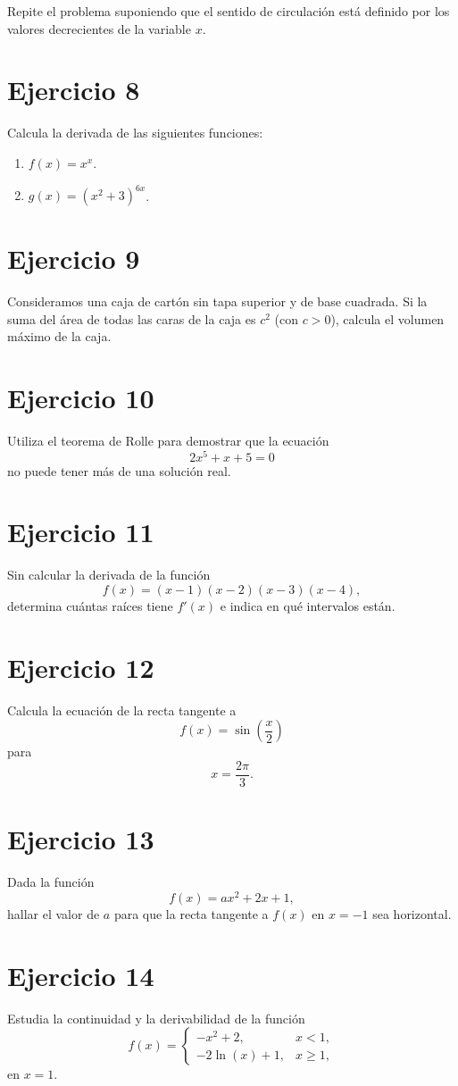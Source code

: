 \documentclass[12pt]{article}
\begin{document}
Repite el problema suponiendo que el sentido de circulación está definido por los valores decrecientes de la variable \(x\).

\section*{Ejercicio 8}
Calcula la derivada de las siguientes funciones:
\begin{enumerate}[label=\alph*)]
    \item \(f(x)=x^x\).
    \item \(g(x)=(x^2+3)^{6x}\).
\end{enumerate}

\section*{Ejercicio 9}
Consideramos una caja de cartón sin tapa superior y de base cuadrada. Si la suma del área de todas las caras de la caja es \(c^2\) (con \(c>0\)), calcula el volumen máximo de la caja.

\section*{Ejercicio 10}
Utiliza el teorema de Rolle para demostrar que la ecuación
\[
2x^5+x+5=0
\]
no puede tener más de una solución real.

\section*{Ejercicio 11}
Sin calcular la derivada de la función
\[
f(x)=(x-1)(x-2)(x-3)(x-4),
\]
determina cuántas raíces tiene \(f'(x)\) e indica en qué intervalos están.

\section*{Ejercicio 12}
Calcula la ecuación de la recta tangente a
\[
f(x)=\sin\left(\frac{x}{2}\right)
\]
para
\[
x=\frac{2\pi}{3}.
\]

\section*{Ejercicio 13}
Dada la función
\[
f(x)=ax^2+2x+1,
\]
hallar el valor de \(a\) para que la recta tangente a \(f(x)\) en \(x=-1\) sea horizontal.

\section*{Ejercicio 14}
Estudia la continuidad y la derivabilidad de la función
\[
f(x)=
\begin{cases}
-x^2+2, & x<1,\\[4pt]
-2\ln(x)+1, & x\ge 1,
\end{cases}
\]
en \(x=1\).
\end{document}
